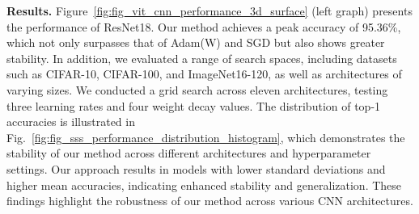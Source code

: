 \textbf{Results.} 
Figure~\ref{fig:fig_vit_cnn_performance_3d_surface} (left graph) presents the performance of ResNet18. Our method achieves a peak accuracy of 95.36\%, which not only surpasses that of Adam(W) and SGD but also shows greater stability. 
In addition, we evaluated a range of search spaces, including datasets such as CIFAR-10, CIFAR-100, and ImageNet16-120, as well as architectures of varying sizes. We conducted a grid search across eleven architectures, testing three learning rates and four weight decay values. The distribution of top-1 accuracies is illustrated in Fig.~\ref{fig:fig_sss_performance_distribution_histogram}, which demonstrates the stability of our method across different architectures and hyperparameter settings. 
Our approach results in models with lower standard deviations and higher mean accuracies, indicating enhanced stability and generalization. These findings highlight the robustness of our method across various CNN architectures.





